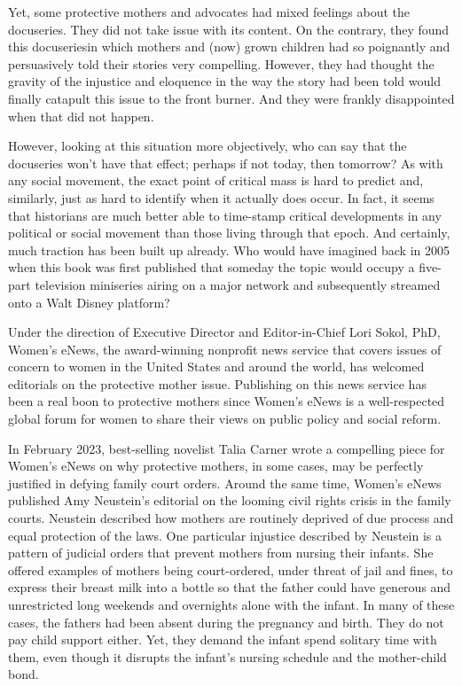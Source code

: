 Yet, some protective mothers and advocates had mixed feelings
about the docuseries. They did not take issue with its content. On the
contrary, they found this docuseries\mdash{}in which mothers and (now)
grown children had so poignantly and persuasively told their stories\mdash{}
very compelling. However, they had thought the gravity of the injustice and eloquence in the way the story had been told would finally
catapult this issue to the front burner. And they were 
frankly disappointed when that did not happen. \pfl{}

However, looking at this situation more objectively, who can say
that the docuseries won’t have that effect; perhaps if not today, then
tomorrow? As with any social movement, the exact point of critical
mass is hard to predict and, similarly, just as hard to identify when
it actually does occur. In fact, it seems that historians are much 
better able to time-stamp critical developments in any political or social
movement than those living through that epoch. And certainly, much
traction has been built up already. Who would have imagined back in
2005 when this book was first published that someday the topic would
occupy a five-part television miniseries airing on a major network and
subsequently streamed onto a Walt Disney platform? \pfl{}


\vspace{4em}


\noindent{}Under the direction of Executive Director and Editor-in-Chief Lori
Sokol, PhD, Women's eNews, the award-winning nonprofit news service that covers issues of concern to women in the United States and
around the world, has welcomed editorials on the protective mother issue. Publishing on this news service has been a real boon to protective
mothers since Women's eNews is a well-respected global forum for
women to share their views on public policy and social reform. \pfl{}

In February 2023, best-selling novelist Talia Carner wrote a 
compelling piece for Women's eNews on why protective mothers, in some
cases, may be perfectly justified in defying family court orders. Around
the same time, Women's eNews published Amy Neustein's editorial on
the looming civil rights crisis in the family courts. Neustein described
how mothers are routinely deprived of due process and equal protection
of the laws.  One particular injustice described by Neustein is a pattern of
judicial orders that prevent mothers from nursing their infants. She 
offered examples of mothers being court-ordered, under threat of jail and
fines, to express their breast milk into a bottle so that the father could
have generous and unrestricted long weekends and overnights alone
with the infant. In many of these cases, the fathers
had been absent during the pregnancy and birth. They do not pay child
support either. Yet, they demand the infant spend solitary time with
them, even though it disrupts the infant's nursing schedule and the
mother\hspace{-.5pt}-\hspace{.5pt}child bond. \pfl{}

